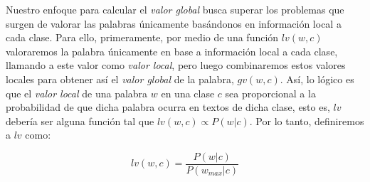 Nuestro enfoque para calcular el \emph{valor global} busca superar los problemas que surgen de valorar las palabras únicamente basándonos en información local a cada clase. Para ello, primeramente, por medio de una función $lv(w,c)$ valoraremos la palabra únicamente en base a información local a cada clase, llamando a este valor como \emph{valor local}, pero luego combinaremos estos valores locales para obtener así el \emph{valor global} de la palabra, $gv(w,c)$.
Así, lo lógico es que el \emph{valor local} de una palabra $w$ en una clase $c$ sea proporcional a la probabilidad de que dicha palabra ocurra en textos de dicha clase, esto es, $lv$ debería ser alguna función tal que $lv(w, c)\propto P(w|c)$. Por lo tanto, definiremos a $lv$ como:


\begin{equation}
\label{eq:lv-first}
lv(w, c) = \frac{P(w|c)}{P(w_{max}|c)}
\end{equation}


